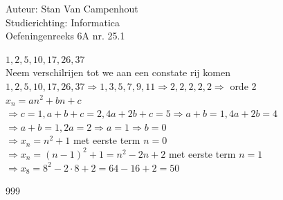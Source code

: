\documentclass[a4paper]{article}
\begin{document}
  
\noindent \large Auteur: Stan Van Campenhout \\
\noindent \large Studierichting:  Informatica\\
\noindent \large Oefeningenreeks 6A nr. 25.1\\

\medskip

\normalsize

$ 1,2,5,10,17,26,37 $\\

Neem verschilrijen tot we aan een constate rij komen \\

$ 1,2,5,10,17,26,37 \Rightarrow 1,3,5,7,9,11 \Rightarrow 2, 2, 2, 2, 2 \Rightarrow $ orde 2 \\

$ x_n = an^2 + bn + c $\\

$ \Rightarrow c = 1, a+b+c = 2, 4a+2b+c = 5 \Rightarrow a + b = 1, 4a + 2b = 4 $\\ 

$ \Rightarrow a+b=1, 2a= 2\Rightarrow a = 1\Rightarrow b = 0 $\\

$ \Rightarrow x_n = n^2 + 1 $ met eerste term $ n = 0 $\\

$ \Rightarrow x_n = \left(n - 1\right)^2 + 1 = n^2-2n+2 $ met eerste term $ n = 1 $\\

$ \Rightarrow x_8 = 8^2-2\cdot8+2 = 64-16+2 = 50 $\\

\begin{thebibliography}{999}
\end{thebibliography}
\end{document}
